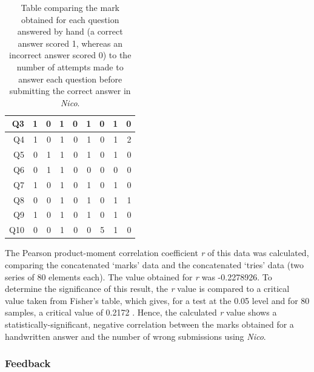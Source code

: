 \documentclass[12pt,twoside,notitlepage,xetex]{report}
\begin{document}
\begin{center}
\begin{table}[H]
\begin{center}
\begin{tabular}{|r||r|r||r|r||r|r||r|r|}
Q3 & 1 & 0 & 1 & 0 & 1 & 0 & 1 & 0\\ \hline
Q4 & 1 & 0 & 1 & 0 & 1 & 0 & 1 & 2\\ \hline
Q5 & 0 & 1 & 1 & 0 & 1 & 0 & 1 & 0\\ \hline
Q6 & 0 & 1 & 1 & 0 & 0 & 0 & 0 & 0\\ \hline
Q7 & 1 & 0 & 1 & 0 & 1 & 0 & 1 & 0\\ \hline
Q8 & 0 & 0 & 1 & 0 & 1 & 0 & 1 & 1\\ \hline
Q9 & 1 & 0 & 1 & 0 & 1 & 0 & 1 & 0\\ \hline
Q10 & 0 & 0 & 1 & 0 & 0 & 5 & 1 & 0\\
\hline
\end{tabular}
\end{center}
\caption{Table comparing the mark obtained for each question answered by hand (a correct answer scored 1, whereas an incorrect answer scored 0) to the number of attempts made to answer each question before submitting the correct answer in \emph{Nico}.}
\label{tab:MarksTries}
\end{table}
\end{center}

The Pearson product-moment correlation coefficient \emph{r} of this data was calculated, comparing the concatenated `marks' data and the concatenated `tries' data (two series of 80 elements each).  The value obtained for \emph{r} was -0.2278926.  To determine the significance of this result, the \emph{r} value is compared to a critical value taken from Fisher's table, which gives, for a test at the 0.05 level and for 80 samples, a critical value of 0.2172 \cite{Fisher1990}.  Hence, the calculated \emph{r} value shows a statistically-significant, negative correlation between the marks obtained for a handwritten answer and the number of wrong submissions using \emph{Nico}.

\subsubsection{Feedback}
\end{document}
